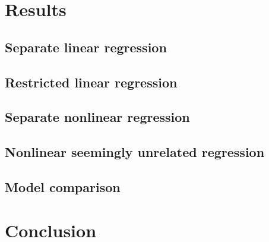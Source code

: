\documentclass{Vorlage}
\begin{document}
\section{Results}

\subsection{Separate linear regression}

\subsection{Restricted linear regression}

\subsection{Separate nonlinear regression}

\subsection{Nonlinear seemingly unrelated regression}

\subsection{Model comparison}



\section{Conclusion}



\clearpage





\end{document}
